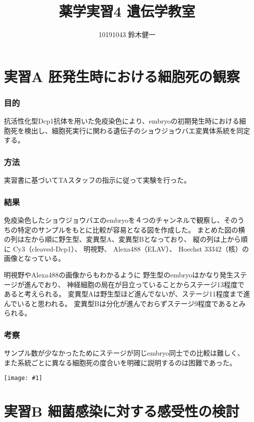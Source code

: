 \documentclass[a4paper,papersize,dvipdfmx]{jsarticle}
\newcommand{\pic}[1]{\begin{center} \texttt{[image: \#1]} \end{center}}   %
\begin{document}
\title{薬学実習4 遺伝学教室}
\author{10191043 鈴木健一}
\date{}
\maketitle



\part*{実習A 胚発生時における細胞死の観察}

\section*{目的}
抗活性化型Dcp1抗体を用いた免疫染色により、embryoの初期発生時における細胞死を検出し、細胞死実行に関わる遺伝子のショウジョウバエ変異体系統を同定する。

\section*{方法}
実習書に基づいてTAスタッフの指示に従って実験を行った。
\section*{結果}
免疫染色したショウジョウバエのembryoを４つのチャンネルで観察し、そのうちの特定のサンプルをもとに比較が容易となる図を作成した。
まとめた図の横の列は左から順に野生型、変異型A、変異型Bとなっており、
縦の列は上から順に
Cy3（cleaved-Dcp1）、
明視野、
Alexa488（ELAV）、
Hoechst 33342（核）の画像となっている。

明視野やAlexa488の画像からもわかるように
野生型のembryoはかなり発生ステージが進んでおり、
神経細胞の局在が目立っていることからステージ13程度であると考えられる。
変異型Aは野生型ほど進んでないが、ステージ11程度まで進んでいると思われる。
変異型Bは分化が進んでおらずステージ9程度であるとみられる。

\section*{考察}
サンプル数が少なかったためにステージが同じembryo同士での比較は難しく、
また系統ごとに異なる細胞死の度合いを明確に説明するのは困難であった。

\pic{id.png}

\newpage

\part*{実習B 細菌感染に対する感受性の検討}
\end{document}
